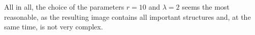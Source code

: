 \documentclass{support/acm_proc_article-sp}
\begin{document}
    All in all, the choice of the parameters $r = 10$ and $\lambda = 2$ seems the most reasonable, as the resulting
    image contains all important structures and, at the same time, is not very complex.


    
    
\end{document}
